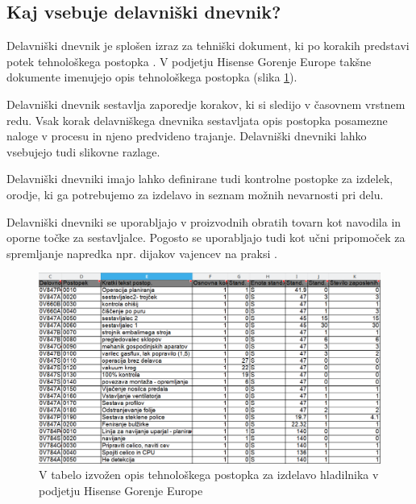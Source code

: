 \documentclass[a4paper, 12pt]{book}
\begin{document}
\subsection {Kaj vsebuje delavniški dnevnik?}

Delavniški dnevnik je splošen izraz za tehniški dokument, ki po korakih predstavi potek tehnološkega postopka \cite{delavniskidnevnikptuj}.
V podjetju Hisense Gorenje Europe takšne dokumente imenujejo opis tehnološkega postopka (slika \ref{sap_2}).

Delavniški dnevnik sestavlja zaporedje korakov, ki si sledijo v časovnem vrstnem redu.
Vsak korak delavniškega dnevnika sestavljata opis postopka posamezne naloge v procesu in njeno predvideno trajanje.
Delavniški dnevniki lahko vsebujejo tudi slikovne razlage.

Delavniški dnevniki imajo lahko definirane tudi kontrolne postopke za izdelek, orodje, ki ga potrebujemo za izdelavo in seznam možnih nevarnosti pri delu.

Delavniški dnevniki se uporabljajo v proizvodnih obratih tovarn kot navodila in oporne točke za sestavljalce.
Pogosto se uporabljajo tudi kot učni pripomoček za spremljanje napredka npr. dijakov vajencev na praksi \cite{delavniskidnevnikptuj, ddsclj}.

\begin{figure}[H]
\begin{center}
\includegraphics[width=13.5cm]{sap_2}
\end{center}
\caption{V tabelo izvožen opis tehnološkega postopka za izdelavo hladilnika v podjetju Hisense Gorenje Europe}
\label{sap_2}
\end{figure}

\end{document}

